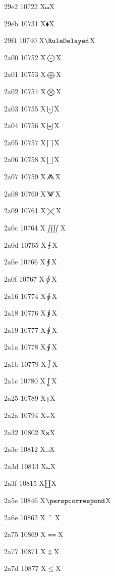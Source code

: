 \documentclass[11pt]{article}
\begin{document}
29e2 10722 X{\ensuremath{\shuffle}}X

29eb 10731 X{\ensuremath{\blacklozenge}}X

29f4 10740 X{\ensuremath{\RuleDelayed}}X

2a00 10752 X{\ensuremath{\bigodot}}X

2a01 10753 X{\ensuremath{\bigoplus}}X

2a02 10754 X{\ensuremath{\bigotimes}}X

2a03 10755 X{\ensuremath{\bigcupdot}}X

2a04 10756 X{\ensuremath{\biguplus}}X

2a05 10757 X{\ensuremath{\bigsqcap}}X

2a06 10758 X{\ensuremath{\bigsqcup}}X

2a07 10759 X{\ensuremath{\conjquant}}X

2a08 10760 X{\ensuremath{\disjquant}}X

2a09 10761 X{\ensuremath{\bigtimes}}X

2a0c 10764 X{\ensuremath{\iiiint}}X

2a0d 10765 X{\ensuremath{\intbar}}X

2a0e 10766 X{\ensuremath{\intBar}}X

2a0f 10767 X{\ensuremath{\clockoint}}X

2a16 10774 X{\ensuremath{\sqrint}}X

2a18 10776 X{\ensuremath{\intx}}X

2a19 10777 X{\ensuremath{\intcap}}X

2a1a 10778 X{\ensuremath{\intcup}}X

2a1b 10779 X{\ensuremath{\upint}}X

2a1c 10780 X{\ensuremath{\lowint}}X

2a25 10789 X{\ensuremath{\plusdot}}X

2a2a 10794 X{\ensuremath{\minusdot}}X

2a32 10802 X{\ensuremath{\btimes}}X

2a3c 10812 X{\ensuremath{\intprod}}X

2a3d 10813 X{\ensuremath{\intprodr}}X

2a3f 10815 X{\ensuremath{\amalg}}X

2a5e 10846 X{\ensuremath{\perspcorrespond}}X

2a6e 10862 X{\ensuremath{\stackrel{*}{=}}}X

2a75 10869 X{\ensuremath{\Equal}}X

2a77 10871 X{\ensuremath{\ddotseq}}X

2a7d 10877 X{\ensuremath{\leqslant}}X
\end{document}
